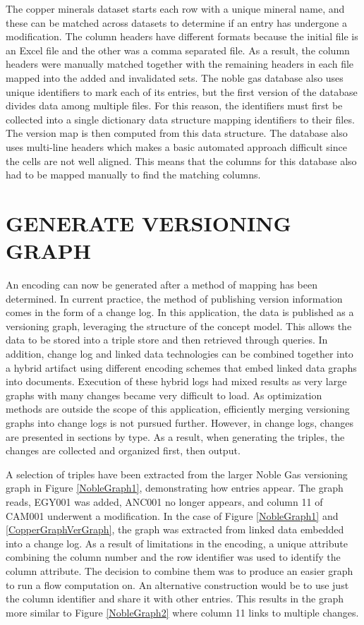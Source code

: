 The copper minerals dataset starts each row with a unique mineral name, and these can be matched across datasets to determine if an entry has undergone a modification.
The column headers have different formats because the initial file is an Excel file and the other was a comma separated file.
As a result, the column headers were manually matched together with the remaining headers in each file mapped into the added and invalidated sets.
The noble gas database also uses unique identifiers to mark each of its entries, but the first version of the database divides data among multiple files.
For this reason, the identifiers must first be collected into a single dictionary data structure mapping identifiers to their files.
The version map is then computed from this data structure.
The database also uses multi-line headers which makes a basic automated approach difficult since the cells are not well aligned.
This means that the columns for this database also had to be mapped manually to find the matching columns.


\section{GENERATE VERSIONING GRAPH}

An encoding can now be generated after a method of mapping has been determined.
In current practice, the method of publishing version information comes in the form of a change log.
In this application, the data is published as a versioning graph, leveraging the structure of the concept model.
This allows the data to be stored into a triple store and then retrieved through queries.
In addition, change log and linked data technologies can be combined together into a hybrid artifact using different encoding schemes that embed linked data graphs into documents.
Execution of these hybrid logs had mixed results as very large graphs with many changes became very difficult to load.
As optimization methods are outside the scope of this application, efficiently merging versioning graphs into change logs is not pursued further.
However, in change logs, changes are presented in sections by type.
As a result, when generating the triples, the changes are collected and organized first, then output.

A selection of triples have been extracted from the larger Noble Gas versioning graph in Figure \ref{NobleGraph1}, demonstrating how entries appear.
The graph reads, EGY001 was added, ANC001 no longer appears, and column 11 of CAM001 underwent a modification.
In the case of Figure \ref{NobleGraph1} and \ref{CopperGraphVerGraph}, the graph was extracted from linked data embedded into a change log.
As a result of limitations in the encoding, a unique attribute combining the column number and the row identifier was used to identify the column attribute.
The decision to combine them was to produce an easier graph to run a flow computation on.
An alternative construction would be to use just the column identifier and share it with other entries.
This results in the graph more similar to Figure \ref{NobleGraph2} where column 11 links to multiple changes.

